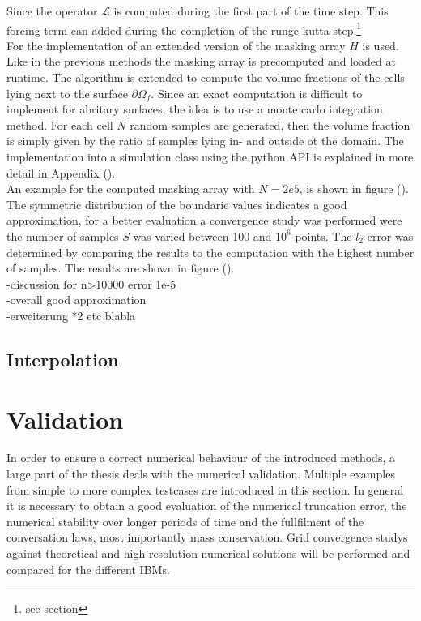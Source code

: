 Since the operator $\mathscr{L}$ is computed during the first part of the time step. This forcing term can added during the completion of the runge kutta step.\footnote{see section}\\
For the implementation of an extended version of the masking array $H$ is used.
Like in the previous methods the masking array is precomputed and loaded at runtime. The algorithm is extended to compute the
volume fractions of the cells lying next to the surface $\partial\Omega_f$.
Since an exact computation is difficult to implement for abritary surfaces, the idea is to use a monte carlo integration method.
For each cell $N$ random samples are generated, then the volume fraction is simply given by the ratio of samples lying in- and outside ot the domain.
The implementation into a simulation class using the python API is explained in more detail in Appendix ().\\
An example for the computed masking array with $N=2e5$, is shown in figure (). The symmetric distribution of the boundarie values indicates
a good approximation, for a better evaluation a convergence study was performed were the number of samples $S$ was varied between 100 and $10^6$ points.
The $l_2$-error was determined by comparing the results to the computation with the highest number of samples.
The results are shown in figure ().\\

-discussion for n>10000 error 1e-5\\
-overall good approximation \\
-erweiterung  *2 etc blabla\\



\subsection{Interpolation}
\newpage

\section{Validation}

In order to ensure a correct numerical behaviour of the introduced methods,
a large part of the thesis deals with the numerical validation.
Multiple examples from simple to more complex testcases are introduced in this section.
In general it is necessary to obtain a good evaluation of the numerical truncation error, the numerical stability over longer periods of time
and the fullfilment of the conversation laws, most importantly mass conservation.
Grid convergence studys against theoretical and high-resolution numerical solutions  will be performed
and compared for the different IBMs.


